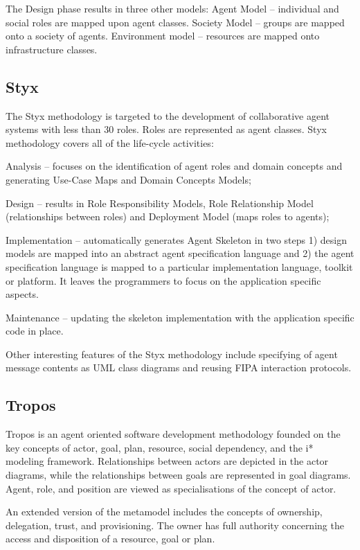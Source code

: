 \documentclass{article}
\begin{document}
The Design phase results in three other models: Agent Model -- individual and social roles are mapped upon agent classes. Society Model -- groups are mapped onto a society of agents. Environment model -- resources are mapped onto infrastructure classes.

\subsection{Styx}

The Styx methodology \cite{bush2001styx} is targeted to the development of collaborative agent systems with less than 30 roles. Roles are represented as agent classes. Styx methodology covers all of the life-cycle activities: 

Analysis -- focuses on the identification of agent roles and domain concepts and generating Use-Case Maps and Domain Concepts Models; 

Design -- results in Role Responsibility Models, Role Relationship Model (relationships between roles) and Deployment Model (maps roles to agents); 

Implementation -- automatically generates Agent Skeleton in two steps 1) design models are mapped into an abstract agent specification language and 2) the agent specification language is mapped to a particular implementation language, toolkit or platform. It leaves the programmers to focus on the application specific aspects.

Maintenance -- updating the skeleton implementation with the application specific code in place.

Other interesting features of the Styx methodology include specifying of agent message contents as UML class diagrams and reusing FIPA interaction protocols.

\subsection{Tropos}

Tropos \cite{journals/informaticaSI/SusiPMG05} is an agent oriented software development methodology founded on the key concepts of actor, goal, plan, resource, social dependency, and the i* modeling framework. Relationships between actors are depicted in the actor diagrams, while the relationships between goals are represented in goal diagrams. Agent, role, and position are viewed as specialisations of the concept of actor.

An extended version of the metamodel includes the concepts of ownership, delegation, trust, and provisioning. The owner has full authority concerning the access and disposition of a resource, goal or plan.
\end{document}
